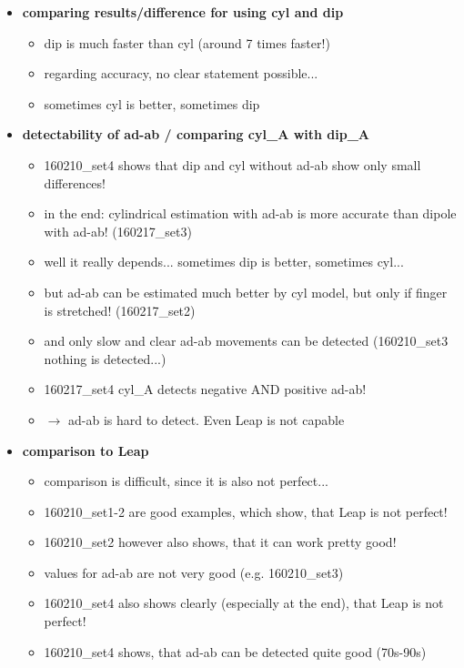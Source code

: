 \begin{itemize}
\item \textbf{comparing results/difference for using cyl and dip}
	\begin{itemize}
	\item dip is much faster than cyl (around 7 times faster!)
	\item regarding accuracy, no clear statement possible...
	\item sometimes cyl is better, sometimes dip

	\end{itemize}

\item \textbf{detectability of ad-ab / comparing cyl\_A with dip\_A}
	\begin{itemize}
	\item 160210\_set4 shows that dip and cyl without ad-ab show only small differences!
	\item in the end: cylindrical estimation with ad-ab is more accurate than dipole with ad-ab! (160217\_set3)
	\item well it really depends... sometimes dip is better, sometimes cyl...
	\item but ad-ab can be estimated much better by cyl model, but only if finger is stretched! (160217\_set2)
	\item and only slow and clear ad-ab movements can be detected (160210\_set3 nothing is detected...)
	\item 160217\_set4 cyl\_A detects negative AND positive ad-ab!
	\item $ \rightarrow $ ad-ab is hard to detect. Even Leap is not capable
	\end{itemize}

\item \textbf{comparison to Leap}
	\begin{itemize}
	\item comparison is difficult, since it is also not perfect...
	\item 160210\_set1-2 are good examples, which show, that Leap is not perfect!
	\item 160210\_set2 however also shows, that it can work pretty good!
	\item values for ad-ab are not very good (e.g. 160210\_set3)
	\item 160210\_set4 also shows clearly (especially at the end), that Leap is not perfect!
	\item 160210\_set4 shows, that ad-ab can be detected quite good (70s-90s)
	\end{itemize}


\end{itemize}
